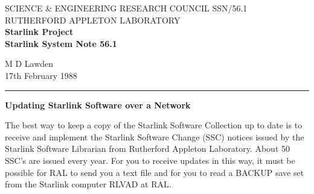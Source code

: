 \pagestyle{myheadings}
\setlength{\textwidth}{160mm}
\setlength{\textheight}{240mm}
\setlength{\topmargin}{-5mm}
\setlength{\oddsidemargin}{0mm}
\setlength{\evensidemargin}{0mm}
\setlength{\parindent}{0mm}
\setlength{\parskip}{\medskipamount}
\setlength{\unitlength}{1mm}


\thispagestyle{empty}
SCIENCE \& ENGINEERING RESEARCH COUNCIL \hfill SSN/56.1\\
RUTHERFORD APPLETON LABORATORY\\
{\large\bf Starlink Project\\}
{\large\bf Starlink System Note 56.1}
\begin{flushright}
M D Lawden\\
17th February 1988
\end{flushright}
\vspace{-4mm}
\rule{\textwidth}{0.5mm}
\vspace{5mm}
\begin{center}
{\Large\bf Updating Starlink Software over a Network}
\end{center}
\vspace{5mm}
The best way to keep a copy of the Starlink Software Collection up to date
is to receive and implement the Starlink Software Change (SSC) notices
issued by the Starlink Software Librarian from Rutherford Appleton Laboratory.
About 50 SSC's are issued every year.
For you to receive updates in this way, it must be possible for RAL to send you
a text file and for you to read a BACKUP save set from the Starlink computer
RLVAD at RAL.

